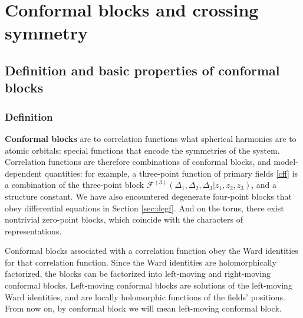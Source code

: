 \documentclass[12pt, a4paper, notitlepage, twoside]{report}
\numberwithin{equation}{section}
\theoremstyle{break}
\begin{document}
\section{Conformal blocks and crossing symmetry \label{secaco}}

\subsection{Definition and basic properties of conformal blocks}

\subsubsection{Definition}

\textbf{\boldmath Conformal blocks} are to correlation functions what spherical harmonics are to atomic orbitals: special functions that encode the symmetries of the system.
Correlation functions are therefore combinations of conformal blocks, and model-dependent quantities: for example, a three-point function of primary fields \eqref{cff} is a combination of 
the three-point block $\mathcal{F}^{(3)}(\Delta_1,\Delta_2,\Delta_3|z_1,z_2,z_3)$, and a structure constant.
We have also encountered degenerate four-point blocks that obey differential equations in Section \ref{sec:degf}.
And on the torus, there exist nontrivial zero-point blocks, which coincide with the characters of representations. 

Conformal blocks associated with a correlation function obey the Ward identities for that correlation function. 
Since the Ward identities are holomorphically factorized, the blocks can be factorized into left-moving and right-moving conformal blocks. Left-moving conformal blocks are solutions of the left-moving Ward identities, and are locally holomorphic functions of the fields' positions. From now on, by conformal block we will mean left-moving conformal block. 
\end{document}

